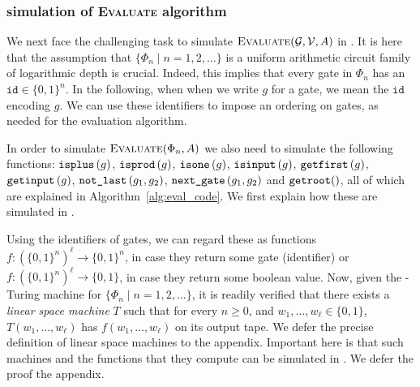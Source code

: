  




\subsubsection{\langfor simulation of {\normalfont \textsc{Evaluate}} algorithm}\label{subsubsec:simulate}
We next face the challenging task to simulate $\textsc{Evaluate}(\mathcal{G},\mathcal{V},A)$ in \langfor. It is here that the
assumption that  $\{\Phi_n\mid n=1,2,\ldots\}$ is a uniform arithmetic circuit family of logarithmic depth is crucial.
Indeed, this implies that every gate in $\Phi_n$ has an $\texttt{id}\in\lbrace 0,1 \rbrace^n$. In the following, when
when we write $g$ for a gate, we mean the $\texttt{id}$ encoding $g$. We can use these identifiers to impose an
ordering on gates, as needed for the evaluation algorithm. 

In order to simulate $\textsc{Evaluate}(\Phi_n,A)$ we also need to simulate the following
functions: $\texttt{isplus}\left( g \right)$, $\texttt{isprod}\left(g \right)$, $\texttt{isone}\left(g \right)$, $\texttt{isinput}\left(g \right)$, $\texttt{getfirst}\left(g \right)$, $\texttt{getinput}\left(g \right)$, $\texttt{not{\_}last}\left(g_1,g_2 \right)$,
\allowbreak $\texttt{next{\_}gate}\left(g_1, g_2 \right)$ and $\texttt{getroot}()$, all of which are explained in Algorithm~\ref{alg:eval_code}. 
We first explain how these are simulated in \langfor.

Using the identifiers of gates, we can regard these as functions $f:(\lbrace 0,1 \rbrace^{n})^\ell\rightarrow\lbrace 0,1 \rbrace^n$, in case they return some gate (identifier) or $f:(\lbrace 0,1 \rbrace^{n})^\ell\rightarrow\lbrace 0,1 \rbrace$,
in case they return some boolean value. Now, given the \logspace-Turing machine for $\{\Phi_n\mid n=1,2,\ldots\}$, it is readily verified that there exists a \textit{linear
space machine} $T$ such that for every $n\geq 0$, and $w_1,\ldots,w_\ell\in\{0,1\}$, $T(w_1,\ldots,w_\ell)$ has $f(w_1,\ldots,w_\ell)$ on its output tape. We defer the precise definition of linear space machines to the appendix.
Important here is that such machines and the functions that they compute  can be simulated in \langfor. We defer the
proof the appendix.


